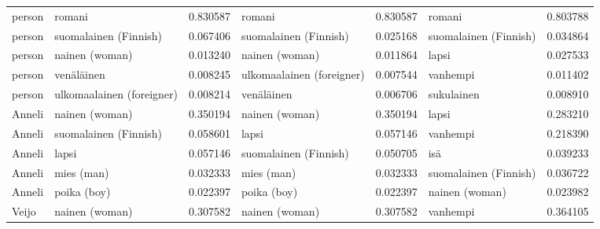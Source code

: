 \begin{tabular}{llrlrlr}
person &                    romani &                         0.830587 &                    romani &                              0.830587 &                romani &                        0.803788 \\
person &     suomalainen (Finnish) &                         0.067406 &     suomalainen (Finnish) &                              0.025168 & suomalainen (Finnish) &                        0.034864 \\
person &            nainen (woman) &                         0.013240 &            nainen (woman) &                              0.011864 &                 lapsi &                        0.027533 \\
person &                venäläinen &                         0.008245 & ulkomaalainen (foreigner) &                              0.007544 &              vanhempi &                        0.011402 \\
person & ulkomaalainen (foreigner) &                         0.008214 &                venäläinen &                              0.006706 &            sukulainen &                        0.008910 \\
Anneli &            nainen (woman) &                         0.350194 &            nainen (woman) &                              0.350194 &                 lapsi &                        0.283210 \\
Anneli &     suomalainen (Finnish) &                         0.058601 &                     lapsi &                              0.057146 &              vanhempi &                        0.218390 \\
Anneli &                     lapsi &                         0.057146 &     suomalainen (Finnish) &                              0.050705 &                   isä &                        0.039233 \\
Anneli &                mies (man) &                         0.032333 &                mies (man) &                              0.032333 & suomalainen (Finnish) &                        0.036722 \\
Anneli &               poika (boy) &                         0.022397 &               poika (boy) &                              0.022397 &        nainen (woman) &                        0.023982 \\
 Veijo &            nainen (woman) &                         0.307582 &            nainen (woman) &                              0.307582 &              vanhempi &                        0.364105 \\

\end{tabular}
